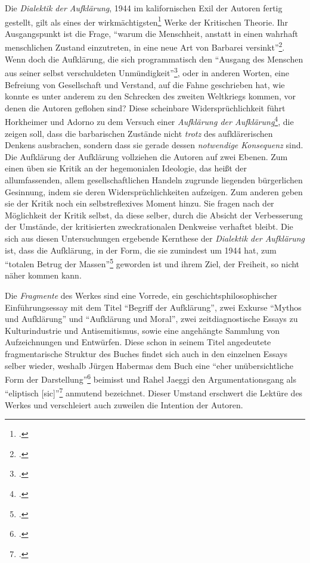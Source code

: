 \documentclass[a4paper, 12pt]{article}
\begin{document}
\begin{onehalfspace}
\noindent Die \emph{Dialektik der Aufklärung}, 1944 im kalifornischen Exil der Autoren fertig gestellt, gilt als eines der wirkmächtigsten\footnote{\Cite[Vgl.][S. 249]{jaeggi}.} Werke der Kritischen Theorie. Ihr Ausgangspunkt ist die Frage, "`warum die Menschheit, anstatt in einen wahrhaft menschlichen Zustand einzutreten, in eine neue Art von Barbarei versinkt"'\footnote{\Cite[Siehe][S. 1]{dialektik-der-aufklaerung}.}. Wenn doch die Aufklärung, die sich programmatisch den "`Ausgang des Menschen aus seiner selbst verschuldeten Unmündigkeit"'\footnote{\Cite[Siehe][S. 481]{kant}.}, oder in anderen Worten, eine Befreiung von Gesellschaft und Verstand, auf die Fahne geschrieben hat, wie konnte es unter anderem zu den Schrecken des zweiten Weltkriegs kommen, vor denen die Autoren geflohen sind? Diese scheinbare Widersprüchlichkeit führt Horkheimer und Adorno zu dem Versuch einer \emph{Aufklärung der Aufklärung}\footnote{\Cite[Vgl.][S. 406]{habermas}.}, die zeigen soll, dass die barbarischen Zustände nicht \emph{trotz} des aufklärerischen Denkens ausbrachen, sondern dass sie gerade dessen \emph{notwendige Konsequenz} sind. Die Aufklärung der Aufklärung vollziehen die Autoren auf zwei Ebenen. Zum einen üben sie Kritik an der hegemonialen Ideologie, das heißt der allumfassenden, allem gesellschaftlichen Handeln zugrunde liegenden bürgerlichen Gesinnung, indem sie deren Widersprüchlichkeiten aufzeigen. Zum anderen geben sie der Kritik noch ein selbstreflexives Moment hinzu. Sie fragen nach der Möglichkeit der Kritik selbst, da diese selber, durch die Absicht der Verbesserung der Umstände, der kritisierten zweckrationalen Denkweise verhaftet bleibt. Die sich aus diesen Untersuchungen ergebende Kernthese der \emph{Dialektik der Aufklärung} ist, dass die Aufklärung, in der Form, die sie zumindest um 1944 hat, zum "`totalen Betrug der Massen"'\footnote{\Cite[Siehe][S. 49]{dialektik-der-aufklaerung}.} geworden ist und ihrem Ziel, der Freiheit, so nicht näher kommen kann. 

Die \emph{Fragmente} des Werkes sind eine Vorrede, ein geschichtsphilosophischer Einfüh\-rungs\-essay mit dem Titel "`Begriff der Aufklärung"', zwei Exkurse "`Mythos und Aufklärung"' und "`Aufklärung und Moral"', zwei zeitdiagnostische Essays zu Kulturindustrie und Antisemitismus, sowie eine angehängte Sammlung von Aufzeichnungen und Entwürfen. Diese schon in seinem Titel angedeutete fragmentarische Struktur des Buches findet sich auch in den einzelnen Essays selber wieder, weshalb Jürgen Habermas dem Buch eine "`eher unübersichtliche Form der Darstellung"'\footnote{\Cite[Siehe][S. 406]{habermas}.} beimisst und Rahel Jaeggi den Argumentationsgang als "`eliptisch [sic]"'\footnote{\Cite[Siehe][S. 250]{jaeggi}.} anmutend bezeichnet. Dieser Umstand erschwert die Lektüre des Werkes und verschleiert auch zuweilen die Intention der Autoren.


\end{onehalfspace}
\end{document}

